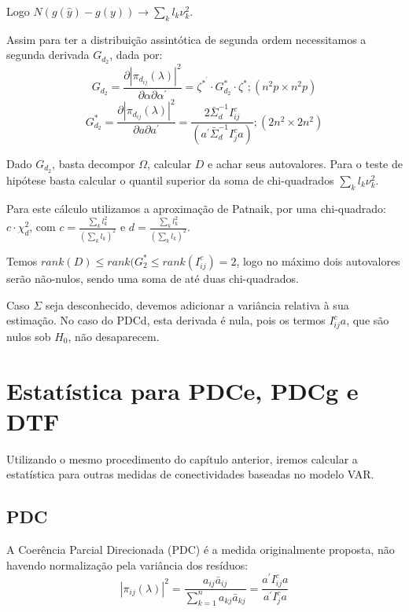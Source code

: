 \documentclass[a4paper,10pt]{article}
\begin{document}
Logo $N (g(\hat{y}) - g(y)) \to \sum_{k} {l_{k} \nu_{k}^{2}}$.

Assim para ter a distribuição assintótica de segunda ordem necessitamos a segunda derivada $G_{d_2}$, dada por:
\begin{equation}
G_{d_2} = \frac{\partial |\pi_{d_{ij}}(\lambda)|^{2}}{\partial \alpha \partial \alpha^{'}} = \zeta^{\ast^{'}} \cdot G_{d_2}^{\ast} \cdot \zeta^{\ast}; (n^{2}p \times n^{2}p)
\end{equation}
\begin{equation}
G_{d_2}^{\ast} = \frac{\partial |\pi_{d_{ij}}(\lambda)|^{2}}{\partial a \partial a^{'}} = \frac{2 \bar{\Sigma}_{d}^{-1} I_{ij}^{c}}{(a^{'} \bar{\Sigma}_{d}^{-1} I_{j}^{c} a)}; (2n^{2} \times 2n^{2})
\end{equation}

Dado $G_{d_2}$, basta decompor $\Omega$, calcular $D$ e achar seus autovalores. Para o teste de hipótese basta calcular o quantil superior da soma de chi-quadrados $\sum_{k} {l_{k} \nu_{k}^{2}}$. 

Para este cálculo utilizamos a aproximação de Patnaik, por uma chi-quadrado: $c\cdot \chi^2_d$, com $c = \frac{\sum_k {l_k^2}}{(\sum_k {l_k})^2}$ e $d = \frac{\sum_k {l_k^2}}{(\sum_k {l_k})^2}$.

Temos $rank(D) \le rank(G_{2}^{\ast} \le rank(I_{ij}^{c}) = 2$, logo no máximo dois autovalores serão não-nulos, sendo uma soma de até duas chi-quadrados.

Caso $\Sigma$ seja desconhecido, devemos adicionar a variância relativa à sua estimação. No caso do PDCd, esta derivada é nula, pois os termos $I_{ij}^{c} a$, que são nulos sob $H_0$, não desaparecem.


\section{Estatística para PDCe, PDCg e DTF}

Utilizando o mesmo procedimento do capítulo anterior, iremos calcular a estatística para outras medidas de conectividades baseadas no modelo VAR.

\subsection{PDC}

A Coerência Parcial Direcionada (PDC) é a medida originalmente proposta, não havendo normalização pela variância dos resíduos:
\begin{equation}
|\pi_{ij}(\lambda)|^{2} = \frac{a_{ij} \bar{a}_{ij}}{\sum_{k=1}^{n}{a_{kj} \bar{a}_{kj}}} = \frac{a^{'} I_{ij}^{c} a}{a^{'} I_{j}^{c} a}
\end{equation}
\end{document}

